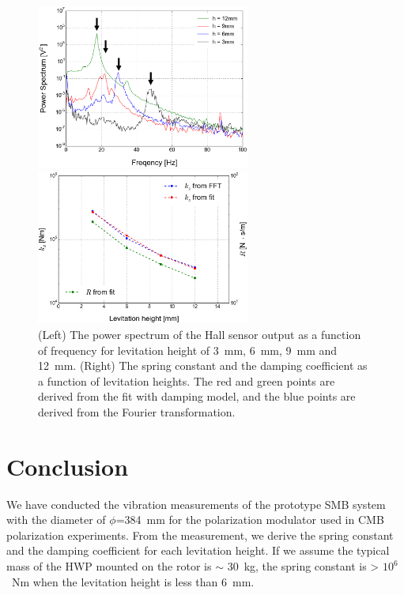 \documentclass[a4paper]{jpconf}
\begin{document}
\begin{figure}[htbp]
  \centering
  \begin{minipage}{0.45\hsize}
    \includegraphics[width=70mm]{vibration_fft_B.eps}
  \end{minipage}
  \begin{minipage}{0.45\hsize}
    \centering
    \includegraphics[width=70mm]{SpringConstant.eps}
  \end{minipage}
  \caption{(Left) The power spectrum of the Hall sensor output as a function of frequency for levitation height of 3~mm, 6~mm, 9~mm and 12~mm.
    (Right) The spring constant and the damping coefficient as a function of levitation heights.
    The red and green points are derived from the fit with damping model, and the blue points are derived from the Fourier transformation.}
  \label{fig:fft}
\end{figure}


\section*{Conclusion}
We have conducted the vibration measurements of the prototype SMB system with the diameter of $\phi$=384~mm for the polarization modulator used in CMB polarization experiments.
From the measurement, we derive the spring constant and the damping coefficient for each levitation height.
If we assume the typical mass of the HWP mounted on the rotor is $\sim$ 30~kg, the spring constant is > $10^{6}$~Nm when the levitation height is less than 6~mm.
\end{document}
